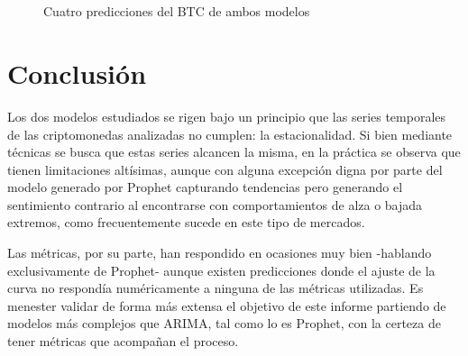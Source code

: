 \documentclass[a4paper,10pt]{article}
\begin{document}
\begin{figure}[h!]
 \centering
   \\
    \\
  \caption{Cuatro predicciones del BTC de ambos modelos}
  \label{f:btc_ax_ph}
\end{figure}







\section{Conclusión}

Los dos modelos estudiados se rigen bajo un principio que las series temporales de las criptomonedas analizadas no cumplen: la estacionalidad. Si bien mediante técnicas se busca que estas series alcancen la misma, en la práctica se observa que tienen limitaciones altísimas, aunque con alguna excepción digna por parte del modelo generado por Prophet capturando tendencias pero generando el sentimiento contrario al encontrarse con comportamientos de alza o bajada extremos, como frecuentemente sucede en este tipo de mercados.

Las métricas, por su parte, han respondido en ocasiones muy bien -hablando exclusivamente de Prophet- aunque existen predicciones donde el ajuste de la curva no respondía numéricamente a ninguna de las métricas utilizadas. Es menester validar de forma más extensa el objetivo de este informe partiendo de modelos más complejos que ARIMA, tal como lo es Prophet, con la certeza de tener métricas que acompañan el proceso.
\end{document}
